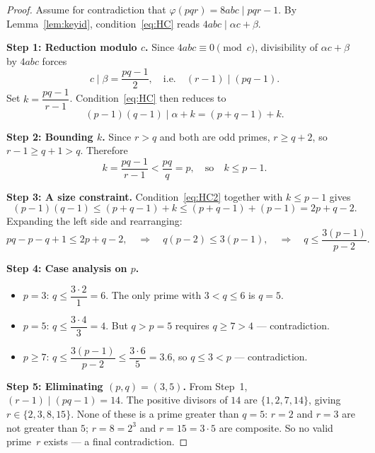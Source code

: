 \documentclass[12pt,a4paper]{amsart}
\theoremstyle{definition}
\newcommand{\euler}{\varphi}
\begin{document}
\begin{proof}
Assume for contradiction that $\euler(pqr) = 8abc \mid pqr - 1$.
By Lemma~\ref{lem:keyid}, condition~\eqref{eq:HC} reads $4abc \mid \alpha c + \beta$.

\medskip
\noindent\textbf{Step 1: Reduction modulo $c$.}
Since $4abc \equiv 0 \pmod{c}$, divisibility of $\alpha c + \beta$ by $4abc$
forces
\[
  c \mid \beta = \frac{pq - 1}{2},
  \quad\text{i.e.}\quad
  (r - 1) \mid (pq - 1).
\]
Set $k = \dfrac{pq - 1}{r - 1}$.  Condition~\eqref{eq:HC} then reduces to
\begin{equation}
  (p-1)(q-1) \mid \alpha + k = (p + q - 1) + k.
  \label{eq:HC2}
\end{equation}

\medskip
\noindent\textbf{Step 2: Bounding $k$.}
Since $r > q$ and both are odd primes, $r \ge q + 2$, so
$r - 1 \ge q + 1 > q$.  Therefore
\[
  k = \frac{pq - 1}{r - 1} < \frac{pq}{q} = p,
  \quad\text{so}\quad k \le p - 1.
\]

\medskip
\noindent\textbf{Step 3: A size constraint.}
Condition~\eqref{eq:HC2} together with $k \le p - 1$ gives
\[
  (p-1)(q-1) \le (p + q - 1) + k \le (p + q - 1) + (p - 1) = 2p + q - 2.
\]
Expanding the left side and rearranging:
\[
  pq - p - q + 1 \le 2p + q - 2,
  \quad\Longrightarrow\quad
  q(p - 2) \le 3(p - 1),
  \quad\Longrightarrow\quad
  q \le \frac{3(p-1)}{p-2}.
\]

\medskip
\noindent\textbf{Step 4: Case analysis on $p$.}
\begin{itemize}
  \item $p = 3$: $q \le \dfrac{3 \cdot 2}{1} = 6$.  The only prime with
        $3 < q \le 6$ is $q = 5$.
  \item $p = 5$: $q \le \dfrac{3 \cdot 4}{3} = 4$.  But $q > p = 5$
        requires $q \ge 7 > 4$ — contradiction.
  \item $p \ge 7$: $q \le \dfrac{3(p-1)}{p-2} \le \dfrac{3 \cdot 6}{5} = 3.6$,
        so $q \le 3 < p$ — contradiction.
\end{itemize}

\medskip
\noindent\textbf{Step 5: Eliminating $(p, q) = (3, 5)$.}
From Step~1, $(r-1) \mid (pq - 1) = 14$.  The positive divisors of $14$ are
$\{1, 2, 7, 14\}$, giving $r \in \{2, 3, 8, 15\}$.
None of these is a prime greater than $q = 5$:
$r = 2$ and $r = 3$ are not greater than $5$;
$r = 8 = 2^3$ and $r = 15 = 3 \cdot 5$ are composite.
So no valid prime~$r$ exists — a final contradiction.
\end{proof}
\end{document}
